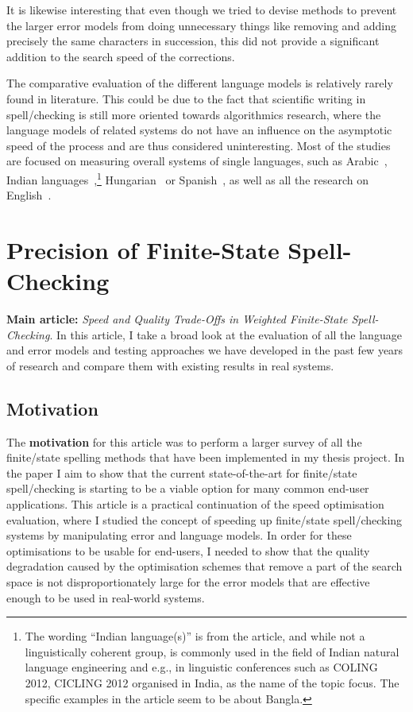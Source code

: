 \documentclass[officiallayout,final]{unihelcompling}
\begin{document}
It is likewise interesting that even though we tried to devise methods to
prevent the larger error models from doing unnecessary things like removing and
adding precisely the same characters in succession, this did not provide a
significant addition to the search speed of the corrections.

The comparative evaluation of the different language models is relatively
rarely found in literature. This could be due to the fact that scientific
writing in spell\-/checking is still more oriented towards algorithmics
research, where the language models of related systems do not have an influence
on the asymptotic speed of the process and are thus considered uninteresting.
Most of the studies are focused on measuring overall systems of single
languages, such as Arabic~\citep{attia2013improved}, Indian
languages~\citep{chaudhuri2002towards},\footnote{The wording ``Indian
    language(s)'' is from the article, and while not a linguistically coherent
    group, is commonly used in the field of Indian natural language engineering
and e.g., in linguistic conferences such as COLING 2012, CICLING 2012 organised
in India, as the name of the topic focus. The specific examples in the article
seem to be about Bangla.} Hungarian~\citep{tron2005hunmorph} or
Spanish~\citep{otero2007contextual}, as well as all the research on
English~\citep{mitton1987spelling}.

\section{Precision of Finite-State Spell-Checking}
\label{sec:quality}

\textbf{Main article:} \emph{Speed and Quality Trade-Offs in Weighted
Finite-State Spell-Checking}. In this article, I take a broad look at the
evaluation of all the language and error models and testing approaches we have
developed in the past few years of research and compare them with existing
results in real systems.

\subsection{Motivation}

The \textbf{motivation} for this article was to perform a larger survey of all
the finite\-/state spelling methods that have been implemented in my thesis
project. In the paper I aim to show that the current state-of-the-art for
finite\-/state spell\-/checking is starting to be a viable option for many
common end-user applications. This article is a practical continuation of the
speed optimisation evaluation, where I studied the concept of speeding up
finite\-/state spell\-/checking systems by manipulating error and language
models. In order for these optimisations to be usable for end-users, I needed
to show that the quality degradation caused by the optimisation schemes that
remove a part of the search space is not disproportionately large for the error
models that are effective enough to be used in real-world systems. 
\end{document}
